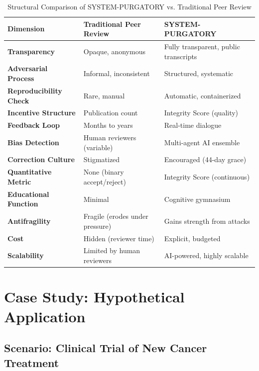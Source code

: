 \documentclass[11pt,a4paper]{article}
\begin{document}
\begin{table}[h!]
\centering
\caption{Structural Comparison of SYSTEM-PURGATORY vs. Traditional Peer Review}
\label{tab:comparison}
\begin{tabular}{@{}p{4cm}p{5cm}p{5cm}@{}}
\toprule
\textbf{Dimension} & \textbf{Traditional Peer Review} & \textbf{SYSTEM-PURGATORY} \\
\midrule
\textbf{Transparency} & Opaque, anonymous & Fully transparent, public transcripts \\
\addlinespace
\textbf{Adversarial Process} & Informal, inconsistent & Structured, systematic \\
\addlinespace
\textbf{Reproducibility Check} & Rare, manual & Automatic, containerized \\
\addlinespace
\textbf{Incentive Structure} & Publication count & Integrity Score (quality) \\
\addlinespace
\textbf{Feedback Loop} & Months to years & Real-time dialogue \\
\addlinespace
\textbf{Bias Detection} & Human reviewers (variable) & Multi-agent AI ensemble \\
\addlinespace
\textbf{Correction Culture} & Stigmatized & Encouraged (44-day grace) \\
\addlinespace
\textbf{Quantitative Metric} & None (binary accept/reject) & Integrity Score (continuous) \\
\addlinespace
\textbf{Educational Function} & Minimal & Cognitive gymnasium \\
\addlinespace
\textbf{Antifragility} & Fragile (erodes under pressure) & Gains strength from attacks \\
\addlinespace
\textbf{Cost} & Hidden (reviewer time) & Explicit, budgeted \\
\addlinespace
\textbf{Scalability} & Limited by human reviewers & AI-powered, highly scalable \\
\bottomrule
\end{tabular}
\end{table}

\section{Case Study: Hypothetical Application}
\label{app:casestudy}

\subsection*{Scenario: Clinical Trial of New Cancer Treatment}
\end{document}
